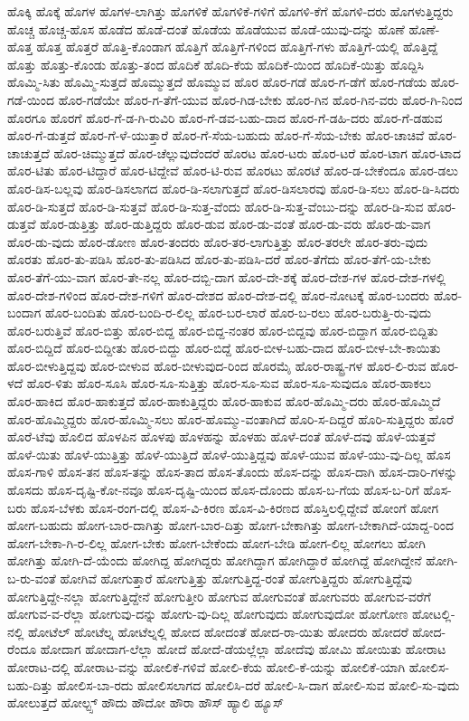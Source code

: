 {ಹೊಕ್ಕಿ
ಹೊಕ್ಕೆ
ಹೊಗಳ
ಹೊಗಳ-ಲಾಗಿತ್ತು
ಹೊಗಳಿಕೆ
ಹೊಗಳಿಕೆ-ಗಳಿಗೆ
ಹೊಗಳಿ-ಕೆಗೆ
ಹೊಗಳಿ-ದರು
ಹೊಗಳುತ್ತಿದ್ದರು
ಹೊಚ್ಚ
ಹೊಚ್ಚ-ಹೊಸ
ಹೊಡೆದ
ಹೊಡೆ-ದಂತೆ
ಹೊಡೆಯ
ಹೊಡೆಯುವ
ಹೊಡೆ-ಯುವು-ದನ್ನು
ಹೊಣೆ
ಹೊಣೆ-ಹೊತ್ತ
ಹೊತ್ತ
ಹೊತ್ತರೆ
ಹೊತ್ತಿ-ಕೊಂಡಾಗ
ಹೊತ್ತಿಗೆ
ಹೊತ್ತಿಗೆ-ಗಳಿಂದ
ಹೊತ್ತಿಗೆ-ಗಳು
ಹೊತ್ತಿಗೆ-ಯಲ್ಲಿ
ಹೊತ್ತಿದ್ದೆ
ಹೊತ್ತು
ಹೊತ್ತು-ಕೊಂಡು
ಹೊತ್ತು-ತಂದ
ಹೊದಿಕೆ
ಹೊದಿ-ಕೆಯ
ಹೊದಿಕೆ-ಯಿಂದ
ಹೊದಿಕೆ-ಯಿತ್ತು
ಹೊದ್ದಿಸಿ
ಹೊಮ್ಮಿ-ಸಿತು
ಹೊಮ್ಮಿ-ಸುತ್ತದೆ
ಹೊಮ್ಮುತ್ತದೆ
ಹೊಮ್ಮುವ
ಹೊರ
ಹೊರ-ಗಡೆ
ಹೊರ-ಗ-ಡೆಗೆ
ಹೊರ-ಗಡೆಯ
ಹೊರ-ಗಡೆ-ಯಿಂದ
ಹೊರ-ಗಡೆಯೇ
ಹೊರ-ಗ-ತೆಗೆ-ಯುವ
ಹೊರ-ಗಿಡ-ಬೇಕು
ಹೊರ-ಗಿನ
ಹೊರ-ಗಿನ-ವರು
ಹೊರ-ಗಿ-ನಿಂದ
ಹೊರಗೂ
ಹೊರಗೆ
ಹೊರ-ಗೆ-ಡ-ಗಿ-ರುವಿರಿ
ಹೊರ-ಗೆ-ಡವ-ಬಹು-ದಾದ
ಹೊರ-ಗೆ-ಡಹಿ-ದರು
ಹೊರ-ಗೆ-ಡಹುವ
ಹೊರ-ಗೆ-ಡುತ್ತದೆ
ಹೊರ-ಗೆ-ಳೆ-ಯುತ್ತಾರೆ
ಹೊರ-ಗೆ-ಸೆಯ-ಬಹುದು
ಹೊರ-ಗೆ-ಸೆಯ-ಬೇಕು
ಹೊರ-ಚಾಚಿವೆ
ಹೊರ-ಚಾಚುತ್ತದೆ
ಹೊರ-ಚಿಮ್ಮುತ್ತದೆ
ಹೊರ-ಚೆಲ್ಲುವುದೆಂದರೆ
ಹೊರಟ
ಹೊರ-ಟರು
ಹೊರ-ಟರೆ
ಹೊರ-ಟಾಗ
ಹೊರ-ಟಾದ
ಹೊರ-ಟಿತು
ಹೊರ-ಟಿದ್ದಾರೆ
ಹೊರ-ಟಿದ್ದೇವೆ
ಹೊರ-ಟಿ-ರುವ
ಹೊರಟು
ಹೊರಟೆ
ಹೊರ-ಡ-ಬೇಕೆಂದೂ
ಹೊರ-ಡಲು
ಹೊರ-ಡಿಸ-ಬಲ್ಲವು
ಹೊರ-ಡಿಸಲಾಗದ
ಹೊರ-ಡಿ-ಸಲಾಗುತ್ತದೆ
ಹೊರ-ಡಿಸಲಾರವು
ಹೊರ-ಡಿ-ಸಲು
ಹೊರ-ಡಿ-ಸಿದರು
ಹೊರ-ಡಿ-ಸುತ್ತದೆ
ಹೊರ-ಡಿ-ಸುತ್ತವೆ
ಹೊರ-ಡಿ-ಸುತ್ತ-ವೆಂದು
ಹೊರ-ಡಿ-ಸುತ್ತ-ವೆಂಬು-ದನ್ನು
ಹೊರ-ಡಿ-ಸುವ
ಹೊರ-ಡುತ್ತವೆ
ಹೊರ-ಡುತ್ತಿತ್ತು
ಹೊರ-ಡುತ್ತಿದ್ದರು
ಹೊರ-ಡುವ
ಹೊರ-ಡು-ವಂತೆ
ಹೊರ-ಡು-ವರು
ಹೊರ-ಡು-ವಾಗ
ಹೊರ-ಡು-ವುದು
ಹೊರ-ಡೋಣ
ಹೊರ-ತಂದರು
ಹೊರ-ತರ-ಲಾಗುತ್ತಿತ್ತು
ಹೊರ-ತರಲೇ
ಹೊರ-ತರು-ವುದು
ಹೊರತು
ಹೊರ-ತು-ಪಡಿಸಿ
ಹೊರ-ತು-ಪಡಿಸಿದ
ಹೊರ-ತು-ಪಡಿಸಿ-ದರೆ
ಹೊರ-ತೆಗೆದು
ಹೊರ-ತೆಗೆ-ಯ-ಬೇಕು
ಹೊರ-ತೆಗೆ-ಯು-ವಾಗ
ಹೊರ-ತೇ-ನಲ್ಲ
ಹೊರ-ದಬ್ಬಿ-ದಾಗ
ಹೊರ-ದೇ-ಶಕ್ಕೆ
ಹೊರ-ದೇಶ-ಗಳ
ಹೊರ-ದೇಶ-ಗಳಲ್ಲಿ
ಹೊರ-ದೇಶ-ಗಳಿಂದ
ಹೊರ-ದೇಶ-ಗಳಿಗೆ
ಹೊರ-ದೇಶದ
ಹೊರ-ದೇಶ-ದಲ್ಲಿ
ಹೊರ-ನೋಟಕ್ಕೆ
ಹೊರ-ಬಂದರು
ಹೊರ-ಬಂದಾಗ
ಹೊರ-ಬಂದಿತು
ಹೊರ-ಬಂದಿ-ರ-ಲಿಲ್ಲ
ಹೊರ-ಬರ-ಲಾರೆ
ಹೊರ-ಬ-ರಲು
ಹೊರ-ಬರುತ್ತಿ-ರು-ವುದು
ಹೊರ-ಬರುತ್ತಿವೆ
ಹೊರ-ಬಿತ್ತು
ಹೊರ-ಬಿದ್ದ
ಹೊರ-ಬಿದ್ದ-ನಂತರ
ಹೊರ-ಬಿದ್ದವು
ಹೊರ-ಬಿದ್ದಾಗ
ಹೊರ-ಬಿದ್ದಿತು
ಹೊರ-ಬಿದ್ದಿದೆ
ಹೊರ-ಬಿದ್ದೀತು
ಹೊರ-ಬಿದ್ದು
ಹೊರ-ಬಿದ್ದೆ
ಹೊರ-ಬೀಳ-ಬಹು-ದಾದ
ಹೊರ-ಬೀಳ-ಬೇ-ಕಾಯಿತು
ಹೊರ-ಬೀಳುತ್ತಿದ್ದವು
ಹೊರ-ಬೀಳುವ
ಹೊರ-ಬೀಳುವುದ-ರಿಂದ
ಹೊರಮೈ
ಹೊರ-ರಾಷ್ಟ್ರ-ಗಳ
ಹೊರ-ಲಿ-ರುವ
ಹೊರ-ಳದೆ
ಹೊರ-ಳಿತು
ಹೊರ-ಸೂಸಿ
ಹೊರ-ಸೂ-ಸುತ್ತಿತ್ತು
ಹೊರ-ಸೂ-ಸುವ
ಹೊರ-ಸೂ-ಸುವುದೂ
ಹೊರ-ಹಾಕಲು
ಹೊರ-ಹಾಕಿದ
ಹೊರ-ಹಾಕುತ್ತದೆ
ಹೊರ-ಹಾಕುತ್ತಿದ್ದರು
ಹೊರ-ಹಾಕುವ
ಹೊರ-ಹೊಮ್ಮಿ-ದರು
ಹೊರ-ಹೊಮ್ಮಿದೆ
ಹೊರ-ಹೊಮ್ಮಿದ್ದರು
ಹೊರ-ಹೊಮ್ಮಿ-ಸಲು
ಹೊರ-ಹೊಮ್ಮು-ವಂತಾಗಿದೆ
ಹೊರಿ-ಸ-ದಿದ್ದರೆ
ಹೊರಿ-ಸುತ್ತಿದ್ದರು
ಹೊರೆ
ಹೊರೆ-ಟೆವು
ಹೊಲಿದ
ಹೊಳಪಿನ
ಹೊಳಪು
ಹೊಳಹನ್ನು
ಹೊಳಹು
ಹೊಳೆ-ದಂತೆ
ಹೊಳೆ-ದವು
ಹೊಳೆ-ಯತ್ತವೆ
ಹೊಳೆ-ಯಿತು
ಹೊಳೆ-ಯುತ್ತಿತ್ತು
ಹೊಳೆ-ಯುತ್ತಿದೆ
ಹೊಳೆ-ಯುತ್ತಿದ್ದವು
ಹೊಳೆ-ಯುವ
ಹೊಳೆ-ಯು-ವು-ದಿಲ್ಲ
ಹೊಸ
ಹೊಸ-ಗಾಳಿ
ಹೊಸ-ತನ
ಹೊಸ-ತನ್ನು
ಹೊಸ-ತಾದ
ಹೊಸ-ತೊಂದು
ಹೊಸ-ದನ್ನು
ಹೊಸ-ದಾಗಿ
ಹೊಸ-ದಾರಿ-ಗಳನ್ನು
ಹೊಸದು
ಹೊಸ-ದೃಷ್ಟಿ-ಕೋ-ನವೂ
ಹೊಸ-ದೃಷ್ಟಿ-ಯಿಂದ
ಹೊಸ-ದೊಂದು
ಹೊಸ-ಬ-ಗೆಯ
ಹೊಸ-ಬ-ರಿಗೆ
ಹೊಸ-ಬರು
ಹೊಸ-ಬೆಳಕು
ಹೊಸ-ರಂಗ-ದಲ್ಲಿ
ಹೊಸ-ವಿ-ಕಿರಣ
ಹೊಸ-ವಿ-ಕಿರಣದ
ಹೊಸ್ತಿಲಲ್ಲಿದ್ದೇವೆ
ಹೋಂಗೆ
ಹೋಗ
ಹೋಗ-ಬಹುದು
ಹೋಗ-ಬಾರ-ದಾಗಿತ್ತು
ಹೋಗ-ಬಾರ-ದಿತ್ತು
ಹೋಗ-ಬೇಕಾಗಿತ್ತು
ಹೋಗ-ಬೇಕಾಗಿದೆ-ಯಾದ್ದ-ರಿಂದ
ಹೋಗ-ಬೇಕಾ-ಗಿ-ರ-ಲಿಲ್ಲ
ಹೋಗ-ಬೇಕು
ಹೋಗ-ಬೇಕೆಂದು
ಹೋಗ-ಬೇಡಿ
ಹೋಗ-ಲಿಲ್ಲ
ಹೋಗಲು
ಹೋಗಿ
ಹೋಗಿತ್ತು
ಹೋಗಿ-ದೆ-ಯೆಂದು
ಹೋಗಿದ್ದ
ಹೋಗಿದ್ದರು
ಹೋಗಿದ್ದಾಗ
ಹೋಗಿದ್ದಾರೆ
ಹೋಗಿದ್ದೆ
ಹೋಗಿದ್ದೇನೆ
ಹೋಗಿ-ಬ-ರು-ವಂತೆ
ಹೋಗಿವೆ
ಹೋಗುತ್ತಾರೆ
ಹೋಗುತ್ತಿತ್ತು
ಹೋಗುತ್ತಿದ್ದ-ರಂತೆ
ಹೋಗುತ್ತಿದ್ದರು
ಹೋಗುತ್ತಿದ್ದೆವು
ಹೋಗುತ್ತಿದ್ದೇ-ನಲ್ಲಾ
ಹೋಗುತ್ತಿದ್ದೇನೆ
ಹೋಗುತ್ತೀರಿ
ಹೋಗುವ
ಹೋಗುವಂತೆ
ಹೋಗುವರು
ಹೋಗುವ-ವರೆಗೆ
ಹೋಗುವ-ವ-ರೆಲ್ಲಾ
ಹೋಗುವು-ದನ್ನು
ಹೋಗು-ವು-ದಿಲ್ಲ
ಹೋಗುವುದು
ಹೋಗುವುದೋ
ಹೋಗೋಣ
ಹೋಟಲ್ಲಿ-ನಲ್ಲಿ
ಹೋಟೆಲ್
ಹೋಟೆಲ್ನ
ಹೋಟೆಲ್ನಲ್ಲಿ
ಹೋದ
ಹೋದಂತೆ
ಹೋದ-ರಾ-ಯಿತು
ಹೋದರು
ಹೋದರೆ
ಹೋದ-ರೆಂದೂ
ಹೋದಾಗ
ಹೋದಾಗ-ಲೆಲ್ಲಾ
ಹೋದೆ
ಹೋದೆ-ಡೆಯಲ್ಲೆಲ್ಲಾ
ಹೋದೆವು
ಹೋಮಿ
ಹೋಯಿತು
ಹೋರಾಟ
ಹೋರಾಟ-ದಲ್ಲಿ
ಹೋರಾಟ-ವನ್ನು
ಹೋಲಿಕೆ-ಗಳಿವೆ
ಹೋಲಿ-ಕೆಯ
ಹೋಲಿ-ಕೆ-ಯನ್ನು
ಹೋಲಿಕೆ-ಯಾಗಿ
ಹೋಲಿಸ-ಬಹು-ದಿತ್ತು
ಹೋಲಿಸ-ಬಾ-ರದು
ಹೋಲಿಸಲಾಗದ
ಹೋಲಿಸಿ-ದರೆ
ಹೋಲಿ-ಸಿ-ದಾಗ
ಹೋಲಿ-ಸುವ
ಹೋಲಿ-ಸು-ವುದು
ಹೋಲುತ್ತದೆ
ಹೋಲ್ಟ್ಸ್
ಹೌದು
ಹೌದೋ
ಹೌರಾ
ಹೌಸ್
ಹ್ಯಾಲಿ
ಹ್ಯೂಸ್
}
